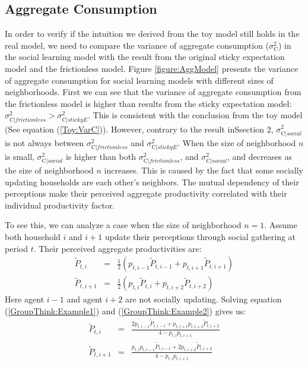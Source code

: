 \documentclass[12pt,letterpaper]{article}
\begin{document}
\subsection{Aggregate Consumption}
In order to verify if the intuition we derived from the toy model still holds in the real model, we need to compare the variance of aggregate consumption ($\sigma^{2}_{\pmb{\mathrm{C}}}$) in the social learning model with the result from the original sticky expectation model and the frictionless model. Figure \ref{figure:AggModel} presents the variance of aggregate consumption for social learning models with different sizes of neighborhoods. First we can see that the variance of aggregate consumption from the frictionless model is higher than results from the sticky expectation model: $\sigma^{2}_{\pmb{\mathrm{C}}|frictionless}>\sigma^{2}_{\pmb{\mathrm{C}}|stickyE}$. This is consistent with the conclusion from the toy model (See equation (\ref{Toy:VarC})). However, contrary to the result inSsection 2, $\sigma^{2}_{\pmb{\mathrm{C}}|social}$ is not always between $\sigma^{2}_{\pmb{\mathrm{C}}|frictionless}$ and $\sigma^{2}_{\pmb{\mathrm{C}}|stickyE}$. When the size of neighborhood $n$ is small, $\sigma^{2}_{\pmb{\mathrm{C}}|social}$ is higher than both $\sigma^{2}_{\pmb{\mathrm{C}}|frictionless}$, and $\sigma^{2}_{\pmb{\mathrm{C}}|social}$, and decreases as the size of neighborhood $n$ increases. This is caused by the fact that some socially updating households are each other's neighbors. The mutual dependency of their perceptions make their perceived aggregate productivity correlated with their individual productivity factor. 
\par
To see this, we can analyze a case when the size of neighborhood $n=1$. Assume both household $i$ and $i+1$ update their perceptions through social gathering at period $t$. Their perceived aggregate productivities are:
\begin{eqnarray}
\tilde{P}_{t,i} & = & \frac{1}{2}\left(p_{t,i-1}\tilde{P}_{t,i-1}+p_{t,i+1}\tilde{P}_{t,i+1}\right) \label{GroupThink:Example1}\\
\tilde{P}_{t,i+1} & = & \frac{1}{2}\left(p_{t,i}\tilde{P}_{t,i}+p_{t,i+2}\tilde{P}_{t,i+2}\right) \label{GroupThink:Example2}
\end{eqnarray}
Here agent $i-1$ and agent $i+2$ are not socially updating. Solving equation (\ref{GroupThink:Example1}) and (\ref{GroupThink:Example2}) gives us:
\begin{eqnarray*}
	\tilde{P}_{t,i} & = & \frac{2p_{t,i-1}\tilde{P}_{t,i-1}+p_{t,i+1}p_{t,i+2}\tilde{P}_{t,i+2}}{4-p_{t,i}p_{t,i+1}}\\
	\tilde{P}_{t,i+1} & = & \frac{p_{t,i}p_{t,i-1}\tilde{P}_{t,i-1}+2p_{t,i+2}\tilde{P}_{t,i+2}}{4-p_{t,i}p_{t,i+1}}
\end{eqnarray*}
\end{document}
